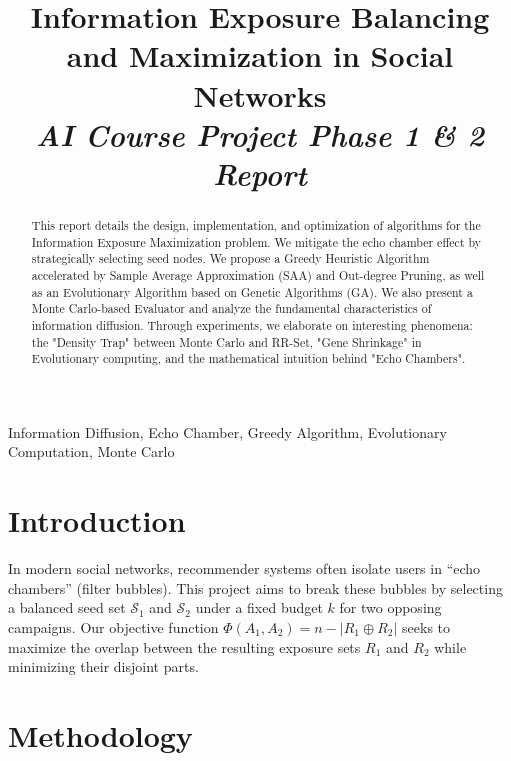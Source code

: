 \documentclass[conference]{IEEEtran}
\begin{document}
\title{Information Exposure Balancing and Maximization in Social Networks\\
\large \textit{AI Course Project Phase 1 \& 2 Report}}

\author{
}

\maketitle

\begin{abstract}
This report details the design, implementation, and optimization of algorithms for the Information Exposure Maximization problem. We mitigate the echo chamber effect by strategically selecting seed nodes. We propose a Greedy Heuristic Algorithm accelerated by Sample Average Approximation (SAA) and Out-degree Pruning, as well as an Evolutionary Algorithm based on Genetic Algorithms (GA). We also present a Monte Carlo-based Evaluator and analyze the fundamental characteristics of information diffusion. Through experiments, we elaborate on interesting phenomena: the "Density Trap" between Monte Carlo and RR-Set, "Gene Shrinkage" in Evolutionary computing, and the mathematical intuition behind "Echo Chambers".
\end{abstract}

\begin{IEEEkeywords}
Information Diffusion, Echo Chamber, Greedy Algorithm, Evolutionary Computation, Monte Carlo
\end{IEEEkeywords}

\section{Introduction}
In modern social networks, recommender systems often isolate users in ``echo chambers'' (filter bubbles). This project aims to break these bubbles by selecting a balanced seed set $\mathcal{S}_1$ and $\mathcal{S}_2$ under a fixed budget $k$ for two opposing campaigns. Our objective function $\Phi(A_1, A_2) = n - |R_1 \oplus R_2|$ seeks to maximize the overlap between the resulting exposure sets $R_1$ and $R_2$ while minimizing their disjoint parts.

\section{Methodology}
\end{document}
